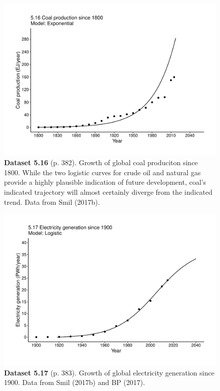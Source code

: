 \documentclass[aps,rmp,preprint,superscriptaddress,10pt,onecolumn]{article}
\begin{document}
\clearpage
\begin{figure}[h]
\includegraphics[width=\textwidth]{output/figs-ggplot/5.16.pdf}
\caption*{\textbf{Dataset 5.16} (p. 382). Growth of global coal produciton since 1800. While the two logistic curves for crude oil and natural gas provide a highly plausible indication of future development, coal's indicated trajectory will almost certainly diverge from the indicated trend. Data from Smil (2017b). }
\end{figure}
	
\clearpage
\begin{figure}[h]
\includegraphics[width=\textwidth]{output/figs-ggplot/5.17.pdf}
\caption*{\textbf{Dataset 5.17} (p. 383). Growth of global electricity generation since 1900. Data from Smil (2017b) and BP (2017). }
\end{figure}
	
\end{document}
